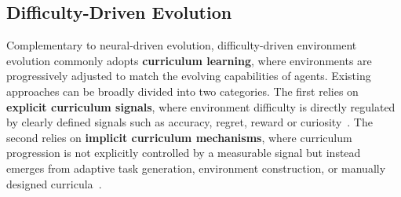 \documentclass{llmxive}
\begin{document}
\subsection{Difficulty-Driven Evolution}\label{sec:diff_evo}
Complementary to neural-driven evolution, difficulty-driven environment evolution commonly adopts \textbf{curriculum learning}, where environments are progressively adjusted to match the evolving capabilities of agents.
Existing approaches can be broadly divided into two categories. 
The first relies on \textbf{explicit curriculum signals}, where environment difficulty is directly regulated by clearly defined signals such as accuracy, regret, reward or curiosity~\cite{RLVE,SCALER,GenEnv,CuES}. 
The second relies on \textbf{implicit curriculum mechanisms}, where curriculum progression is not explicitly controlled by a measurable signal but instead emerges from adaptive task generation, environment construction, or manually designed curricula~\cite{DreamGym,AgentGen,Reasoning_Core,Environment_Tuning}. 
\end{document}

